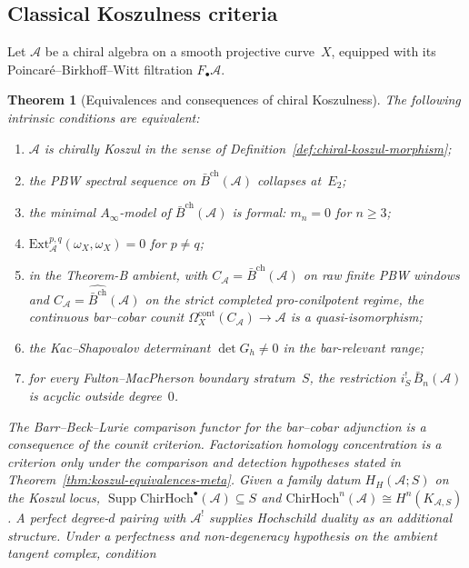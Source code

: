 \documentclass[11pt,reqno]{amsart}
\newtheorem{theorem}{Theorem}[section]
\theoremstyle{definition}
\theoremstyle{remark}
\newcommand{\cA}{\mathcal{A}}
\newcommand{\barB}{\bar{B}}
\newcommand{\barBgeom}{\bar{B}^{\mathrm{ch}}}
\newcommand{\Ext}{\mathrm{Ext}}
\newcommand{\ChirHoch}{\mathrm{ChirHoch}}
\numberwithin{equation}{section}
\begin{document}
\subsection{Classical Koszulness criteria}

Let $\cA$ be a chiral algebra on a smooth projective curve~$X$,
equipped with its Poincar\'e--Birkhoff--Witt filtration
$F_\bullet\cA$.

\begin{theorem}[Equivalences and consequences of chiral Koszulness]
The following intrinsic conditions are equivalent:
\begin{enumerate}[leftmargin=2.8em]
\item[\textup{(i)}] $\cA$ is chirally Koszul in the sense of
 Definition~\ref{def:chiral-koszul-morphism};
\item[\textup{(ii)}] the PBW spectral sequence on $\barBgeom(\cA)$ collapses
 at~$E_2$;
\item[\textup{(iii)}] the minimal $A_\infty$-model of $\barBgeom(\cA)$ is formal:
 $m_n = 0$ for $n \ge 3$;
\item[\textup{(iv)}] $\Ext^{p,q}_\cA(\omega_X,\omega_X) = 0$ for $p \ne q$;
\item[\textup{(v)}] in the Theorem-B ambient, with
 $C_\cA=\barBgeom(\cA)$ on raw finite PBW windows and
 $C_\cA=\widehat{\barBgeom}(\cA)$ on the strict completed
 pro-conilpotent regime, the continuous bar--cobar counit
 $\Omega_X^{\mathrm{cont}}(C_\cA) \to \cA$ is a quasi-isomorphism;
\item[\textup{(ix)}] the Kac--Shapovalov determinant $\det G_h \neq 0$ in the
 bar-relevant range;
\item[\textup{(x)}] for every Fulton--MacPherson boundary stratum~$S$, the
 restriction $i_S^!\,\barB_n(\cA)$ is acyclic outside degree~$0$.
\end{enumerate}
The Barr--Beck--Lurie comparison functor for the bar--cobar
adjunction is a consequence of the counit criterion. Factorization
homology concentration is a criterion only under the comparison and
detection hypotheses stated in Theorem~\ref{thm:koszul-equivalences-meta}.
Given a family datum $H_H(\cA;S)$ on the Koszul locus,
$\operatorname{Supp}\ChirHoch^\bullet(\cA)\subseteq S$ and
$\ChirHoch^n(\cA)\cong H^n(K_{\cA,S})$.  A perfect degree-$d$
pairing with $\cA^!$ supplies Hochschild duality as an additional
structure.
Under a perfectness and non-degeneracy hypothesis on the ambient
tangent complex, condition
\begin{enumerate}[label=\textup{(\roman*)},leftmargin=2.4em,start=11]

\end{enumerate}
\end{theorem}
\end{document}
